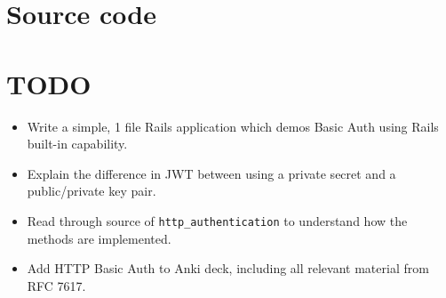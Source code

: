 \documentclass{article}
\begin{document}
\section{Source code}

\section{TODO}

\begin{itemize}
  \item Write a simple, 1 file Rails application which demos Basic Auth
    using Rails built-in capability.
  \item Explain the difference in JWT between using a private secret and a
    public/private key pair.
  \item Read through source of \texttt{http\_authentication} to understand how
    the methods are implemented.
  \item Add HTTP Basic Auth to Anki deck, including all relevant material from
    RFC 7617.
\end{itemize}
\end{document}
